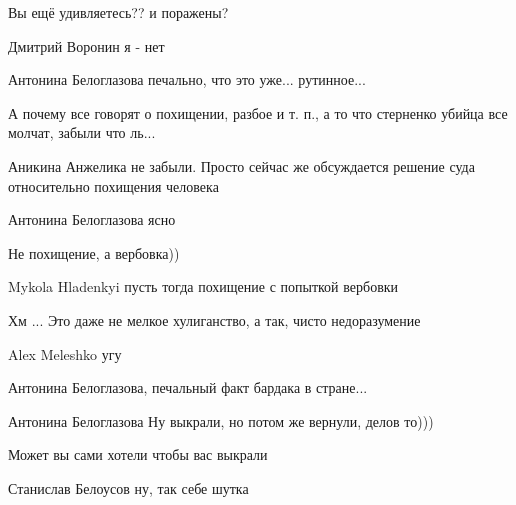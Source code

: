 \begin{itemize}

Вы ещё удивляетесь?? и поражены?

Дмитрий Воронин я - нет

Антонина Белоглазова печально, что это уже... рутинное...

А почему все говорят о похищении, разбое и т. п., а то что стерненко убийца все молчат, забыли что ль...

Аникина Анжелика не забыли. Просто сейчас же обсуждается решение суда относительно похищения человека


Антонина Белоглазова ясно


Не похищение, а вербовка))


Mykola Hladenkyi пусть тогда похищение с попыткой вербовки


Хм ... Это даже не мелкое хулиганство, а так, чисто недоразумение


Alex Meleshko угу

Антонина Белоглазова, печальный факт бардака в стране...

Антонина Белоглазова
Ну выкрали, но потом же вернули, делов то)))

Может вы сами хотели чтобы вас выкрали 

Станислав Белоусов ну, так себе шутка

\end{itemize}
